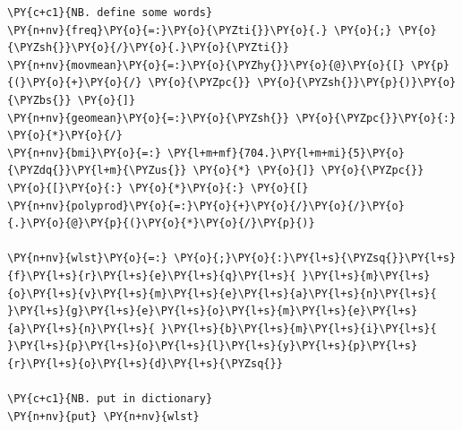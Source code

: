     \begin{tcolorbox}[breakable, size=fbox, boxrule=1pt, pad at break*=1mm,colback=cellbackground, colframe=cellborder]
\begin{Verbatim}[commandchars=\\\{\}]
\PY{c+c1}{NB. define some words}
\PY{n+nv}{freq}\PY{o}{=:}\PY{o}{\PYZti{}}\PY{o}{.} \PY{o}{;} \PY{o}{\PYZsh{}}\PY{o}{/}\PY{o}{.}\PY{o}{\PYZti{}}
\PY{n+nv}{movmean}\PY{o}{=:}\PY{o}{\PYZhy{}}\PY{o}{@}\PY{o}{[} \PY{p}{(}\PY{o}{+}\PY{o}{/} \PY{o}{\PYZpc{}} \PY{o}{\PYZsh{}}\PY{p}{)}\PY{o}{\PYZbs{}} \PY{o}{]}
\PY{n+nv}{geomean}\PY{o}{=:}\PY{o}{\PYZsh{}} \PY{o}{\PYZpc{}}\PY{o}{:} \PY{o}{*}\PY{o}{/}
\PY{n+nv}{bmi}\PY{o}{=:} \PY{l+m+mf}{704.}\PY{l+m+mi}{5}\PY{o}{\PYZdq{}}\PY{l+m}{\PYZus{}} \PY{o}{*} \PY{o}{]} \PY{o}{\PYZpc{}} \PY{o}{[}\PY{o}{:} \PY{o}{*}\PY{o}{:} \PY{o}{[}
\PY{n+nv}{polyprod}\PY{o}{=:}\PY{o}{+}\PY{o}{/}\PY{o}{/}\PY{o}{.}\PY{o}{@}\PY{p}{(}\PY{o}{*}\PY{o}{/}\PY{p}{)}

\PY{n+nv}{wlst}\PY{o}{=:} \PY{o}{;}\PY{o}{:}\PY{l+s}{\PYZsq{}}\PY{l+s}{f}\PY{l+s}{r}\PY{l+s}{e}\PY{l+s}{q}\PY{l+s}{ }\PY{l+s}{m}\PY{l+s}{o}\PY{l+s}{v}\PY{l+s}{m}\PY{l+s}{e}\PY{l+s}{a}\PY{l+s}{n}\PY{l+s}{ }\PY{l+s}{g}\PY{l+s}{e}\PY{l+s}{o}\PY{l+s}{m}\PY{l+s}{e}\PY{l+s}{a}\PY{l+s}{n}\PY{l+s}{ }\PY{l+s}{b}\PY{l+s}{m}\PY{l+s}{i}\PY{l+s}{ }\PY{l+s}{p}\PY{l+s}{o}\PY{l+s}{l}\PY{l+s}{y}\PY{l+s}{p}\PY{l+s}{r}\PY{l+s}{o}\PY{l+s}{d}\PY{l+s}{\PYZsq{}}

\PY{c+c1}{NB. put in dictionary}
\PY{n+nv}{put} \PY{n+nv}{wlst}


\end{Verbatim}
\end{tcolorbox}
